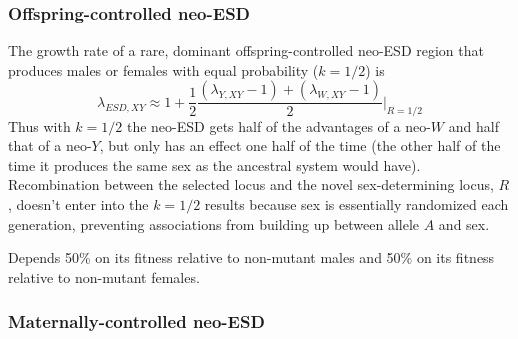 \documentclass[12pt]{article}
\begin{document}
\subsubsection*{Offspring-controlled neo-ESD}

The growth rate of a rare, dominant offspring-controlled neo-ESD region that produces males or females with equal probability ($k=1/2$) is
\begin{equation}
\lambda_{ESD,XY} \approx 1 + \frac{1}{2}\frac{(\lambda_{Y,XY} - 1) + (\lambda_{W,XY} -1)}{2} \Big|_{R=1/2}
\label{eq:lambda_ESD}
\end{equation}
Thus with $k=1/2$ the neo-ESD gets half of the advantages of a neo-$W$ and half that of a neo-$Y$, but only has an effect one half of the time (the other half of the time it produces the same sex as the ancestral system would have).  
Recombination between the selected locus and the novel sex-determining locus, $R$, doesn't enter into the $k=1/2$ results because sex is essentially randomized each generation, %
preventing associations from building up between allele $A$ and sex.  

Depends 50\% on its fitness relative to non-mutant males and 50\% on its fitness relative to non-mutant females. 

\subsubsection*{Maternally-controlled neo-ESD}
\end{document}
